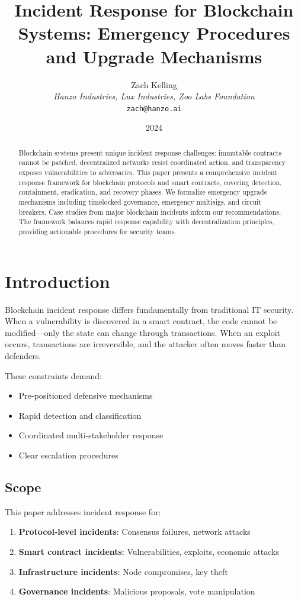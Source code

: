 \documentclass[11pt,a4paper]{article}
\title{Incident Response for Blockchain Systems: Emergency Procedures and Upgrade Mechanisms}
\author{Zach Kelling\\
\textit{Hanzo Industries, Lux Industries, Zoo Labs Foundation}\\
\texttt{zach@hanzo.ai}}
\date{2024}
\theoremstyle{definition}
\begin{document}
\maketitle

\begin{abstract}
Blockchain systems present unique incident response challenges: immutable contracts cannot be patched, decentralized networks resist coordinated action, and transparency exposes vulnerabilities to adversaries. This paper presents a comprehensive incident response framework for blockchain protocols and smart contracts, covering detection, containment, eradication, and recovery phases. We formalize emergency upgrade mechanisms including timelocked governance, emergency multisigs, and circuit breakers. Case studies from major blockchain incidents inform our recommendations. The framework balances rapid response capability with decentralization principles, providing actionable procedures for security teams.
\end{abstract}

\section{Introduction}

Blockchain incident response differs fundamentally from traditional IT security. When a vulnerability is discovered in a smart contract, the code cannot be modified---only the state can change through transactions. When an exploit occurs, transactions are irreversible, and the attacker often moves faster than defenders.

These constraints demand:
\begin{itemize}
    \item Pre-positioned defensive mechanisms
    \item Rapid detection and classification
    \item Coordinated multi-stakeholder response
    \item Clear escalation procedures
\end{itemize}

\subsection{Scope}

This paper addresses incident response for:
\begin{enumerate}
    \item \textbf{Protocol-level incidents}: Consensus failures, network attacks
    \item \textbf{Smart contract incidents}: Vulnerabilities, exploits, economic attacks
    \item \textbf{Infrastructure incidents}: Node compromises, key theft
    \item \textbf{Governance incidents}: Malicious proposals, vote manipulation
\end{enumerate}
\end{document}
